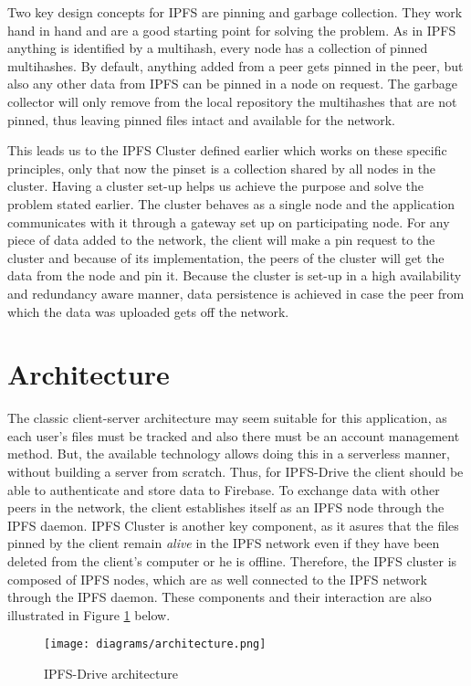 \documentclass[12pt]{report}
\begin{document}
Two key design concepts for IPFS are pinning and garbage collection. They work hand in hand and are a good starting point for solving the problem. As in IPFS anything is identified by a multihash, every node has a collection of pinned multihashes. By default, anything added from a peer gets pinned in the peer, but also any other data from IPFS can be pinned in a node on request. The garbage collector will only remove from the local repository the multihashes that are not pinned, thus leaving pinned files intact and available for the network.

This leads us to the IPFS Cluster defined earlier which works on these specific principles, only that now the pinset is a collection shared by all nodes in the cluster. Having a cluster set-up helps us achieve the purpose and solve the problem stated earlier. The cluster behaves as a single node and the application communicates with it through a gateway set up on participating node. For any piece of data added to the network, the client will make a pin request to the cluster and because of its implementation, the peers of the cluster will get the data from the node and pin it. Because the cluster is set-up in a high availability and redundancy aware manner, data persistence is achieved in case the peer from which the data was uploaded gets off the network.

\section{Architecture}

The classic client-server architecture may seem suitable for this application, as each user's files must be tracked and also there must be an account management method. But, the available technology allows doing this in a serverless manner, without building a server from scratch. Thus, for IPFS-Drive the client should be able to authenticate and store data to Firebase. To exchange data with other peers in the network, the client establishes itself as an IPFS node through the IPFS daemon. IPFS Cluster is another key component, as it asures that the files pinned by the client remain \textit{alive} in the IPFS network even if they have been deleted from the client's computer or he is offline. Therefore, the IPFS cluster is composed of IPFS nodes, which are as well connected to the IPFS network through the IPFS daemon. These components and their interaction are also illustrated in Figure \ref{fig:architecture} below. 

\begin{figure}[H]
\centerline{\texttt{[image: diagrams/architecture.png]}}
    \caption{IPFS-Drive architecture}
    \label{fig:architecture}
\end{figure}
\end{document}

